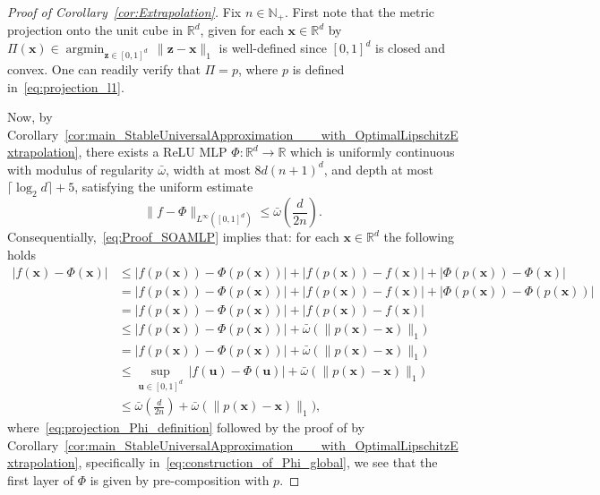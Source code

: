 \documentclass{article}
\numberwithin{equation}{section}
\theoremstyle{definition}
\begin{document}
\begin{proof}[{Proof of Corollary~\ref{cor:Extrapolation}}]
Fix $n\in \mathbb{N}_+$.
First note that the 
metric projection onto the unit cube in $\mathbb{R}^d$, given for each $\mathbf{x}\in \mathbb{R}^d$ by $
    \Pi(\mathbf{x}) \in \operatorname{argmin}_{\mathbf{z}\in 
    [0,1]^d
    }\, \|\mathbf{z}-\mathbf{x}\|_1
$ is well-defined since $[0,1]^d$ is closed and convex.  One can readily verify that $\Pi=p$, where $p$ is defined in~\eqref{eq:projection_l1}.

Now, by Corollary~\ref{cor:main_StableUniversalApproximation___with_OptimalLipschitzExtrapolation}, there exists a ReLU MLP $\Phi:\mathbb{R}^d\to \mathbb{R}$ which is uniformly continuous with modulus of regularity $\bar{\omega}$, width at most $8d(n+1)^d$, and depth at most $\lceil \log_2{d} \rceil + 5$, satisfying the uniform estimate
\begin{equation}
\label{eq:Proof_SOAMLP}
        \|f-\Phi\|_{L^{\infty}([0,1]^d)} 
    \le 
        \bar{\omega}\left(\frac{d}{2n}\right)
.
\end{equation}   
Consequentially,~\eqref{eq:Proof_SOAMLP} implies that: for each $\mathbf{x}\in \mathbb{R}^d$ the following holds
\allowdisplaybreaks
\begin{align}
\nonumber
        |f(\mathbf{x})-\Phi(\mathbf{x})|
    & \le 
        |f(p(\mathbf{x}))-\Phi(p(\mathbf{x}))|
        +
        |f(p(\mathbf{x}))-f(\mathbf{x})|
        +
        |\Phi(p(\mathbf{x}))-\Phi(\mathbf{x})|
\\
\label{eq:projection_Phi_definition}
& =
        |f(p(\mathbf{x}))-\Phi(p(\mathbf{x}))|
        +
        |f(p(\mathbf{x}))-f(\mathbf{x})|
        +
        |\Phi(p(\mathbf{x}))-\Phi(p(\mathbf{x}))|
\\
\nonumber
& = 
        |f(p(\mathbf{x}))-\Phi(p(\mathbf{x}))|
        +
        |f(p(\mathbf{x}))-f(\mathbf{x})|
\\
\nonumber
& \le 
        |f(p(\mathbf{x}))-\Phi(p(\mathbf{x}))|
        +
        \bar{\omega}(\|p(\mathbf{x})-\mathbf{x})\|_1)
\\
\nonumber
&= 
        |f(p(\mathbf{x}))-\Phi(p(\mathbf{x}))|
        +
        \bar{\omega}(\|p(\mathbf{x})-\mathbf{x})\|_1)
\\
\nonumber
& \le 
        \sup_{\mathbf{u}\in [0,1]^d}\,
        |f(\mathbf{u})-\Phi(\mathbf{u})|
        +
        \bar{\omega}(\|p(\mathbf{x})-\mathbf{x})\|_1)
\\
\label{eq:express_as_distance__from_projection}
& \le 
        \bar{\omega}\left(\frac{d}{2n}\right)
        +
        \bar{\omega}(\|p(\mathbf{x})-\mathbf{x})\|_1)
,
\end{align}
where~\eqref{eq:projection_Phi_definition} followed by the proof of by Corollary~\ref{cor:main_StableUniversalApproximation___with_OptimalLipschitzExtrapolation}, specifically in~\eqref{eq:construction_of_Phi_global}, we see that the first layer of $\Phi$ is given by pre-composition with $p$.  




\end{proof}
\end{document}

